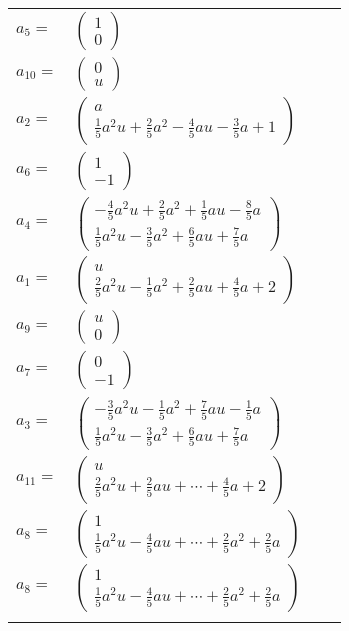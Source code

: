 \documentclass[1p]{elsarticle_modified}
\theoremstyle{definition}
\begin{document}
\begin{tabular}{m{7pt} m{180pt} m{7pt} m{180pt} }
\flushright $a_{5}=$&$\begin{pmatrix}1\\0\end{pmatrix}$ \\
\flushright $a_{10}=$&$\begin{pmatrix}0\\u\end{pmatrix}$ \\
\flushright $a_{2}=$&$\begin{pmatrix}a\\\frac{1}{5} a^2 u+\frac{2}{5} a^2-\frac{4}{5} a u-\frac{3}{5} a+1\end{pmatrix}$ \\
\flushright $a_{6}=$&$\begin{pmatrix}1\\-1\end{pmatrix}$ \\
\flushright $a_{4}=$&$\begin{pmatrix}-\frac{4}{5} a^2 u+\frac{2}{5} a^2+\frac{1}{5} a u-\frac{8}{5} a\\\frac{1}{5} a^2 u-\frac{3}{5} a^2+\frac{6}{5} a u+\frac{7}{5} a\end{pmatrix}$ \\
\flushright $a_{1}=$&$\begin{pmatrix}u\\\frac{2}{5} a^2 u-\frac{1}{5} a^2+\frac{2}{5} a u+\frac{4}{5} a+2\end{pmatrix}$ \\
\flushright $a_{9}=$&$\begin{pmatrix}u\\0\end{pmatrix}$ \\
\flushright $a_{7}=$&$\begin{pmatrix}0\\-1\end{pmatrix}$ \\
\flushright $a_{3}=$&$\begin{pmatrix}-\frac{3}{5} a^2 u-\frac{1}{5} a^2+\frac{7}{5} a u-\frac{1}{5} a\\\frac{1}{5} a^2 u-\frac{3}{5} a^2+\frac{6}{5} a u+\frac{7}{5} a\end{pmatrix}$ \\
\flushright $a_{11}=$&$\begin{pmatrix}u\\\frac{2}{5} a^2 u+\frac{2}{5} a u+\cdots+\frac{4}{5} a+2\end{pmatrix}$ \\
\flushright $a_{8}=$&$\begin{pmatrix}1\\\frac{1}{5} a^2 u-\frac{4}{5} a u+\cdots+\frac{2}{5} a^2+\frac{2}{5} a\end{pmatrix}$\\ \flushright $a_{8}=$&$\begin{pmatrix}1\\\frac{1}{5} a^2 u-\frac{4}{5} a u+\cdots+\frac{2}{5} a^2+\frac{2}{5} a\end{pmatrix}$\\&\end{tabular}
\end{document}
